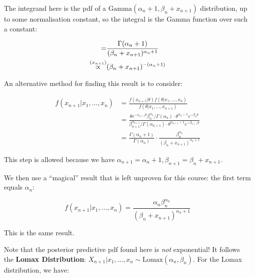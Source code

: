 \documentclass[a4paper]{article}
\begin{document}
                The integrand here is the pdf of a $\text{Gamma}(\alpha_{n} + 1,
                \beta_{n} + x_{n+1})$ distribution, up to some normalisation
                constant, so the integral is the Gamma function over such a
                constant:

                \begin{align*}
                    = & \frac{\Gamma(\alpha_n + 1)}{(\beta_n + x_{n+1})
                        ^{\alpha_n + 1}} \\
                    \stackrel{({x_{n+1}})}{\propto} & (\beta_n + x_{n+1})^{-(\alpha_n + 1)}
                \end{align*}

                An alternative method for finding this result is to consider:

                \begin{align*}
                    f(x_{n+1} | x_1, ..., x_n) & = \frac{f(x_{n+1} | \theta)
                        f(\theta | x_1, ..., x_n)}{f(\theta | x_1, ...,
                        x_{n+1})} \\
                    & = \frac{\theta e^{-x_{n+1}\theta}\beta_n^{\alpha_n} /
                        \Gamma(\alpha_n) \cdot \theta^{\alpha_n - 1} e^{-\beta_n
                        \theta}}{\beta_{n+1}^{\alpha_{n+1}}/\Gamma(\alpha_{n+1})
                        \cdot \theta^{\alpha_{n+1} - 1} e^{-\beta_{n+1}\theta}}
                        \\
                    & = \frac{\Gamma(\alpha_n + 1)}{\Gamma(\alpha_n)} \cdot
                        \frac{\beta_n^{\alpha_n}}{(\beta_n + x_{n+1})^{\alpha_n
                        + 1}}
                \end{align*}

                This step is allowed because we have $\alpha_{n+1} = \alpha_n +
                1, \beta_{n+1} = \beta_n + x_{n+1}$.

                We then use a ``magical'' result that is left unproven for this
                course: the first term equals $\alpha_n$:

                \[
                    f(x_{n+1} | x_1, ..., x_n) = \frac{\alpha_n
                    \beta_n^{\alpha_n}}{(\beta_n + x_{n+1})^{\alpha_n + 1}}
                \]

                This is the same result.

                Note that the posterior predictive pdf found here is
                \textit{not} exponential! It follows the \textbf{Lomax
                Distribution}: $X_{n+1} | x_1, ..., x_n \sim
                \text{Lomax}(\alpha_n, \beta_n)$. For the Lomax distribution, we
                have:
\end{document}
